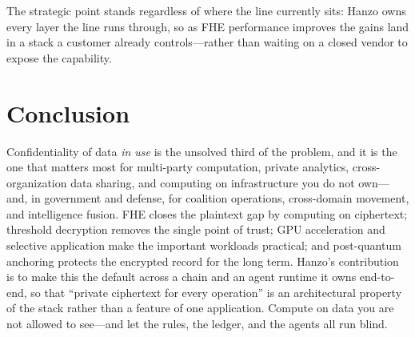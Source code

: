 \documentclass[11pt,letterpaper]{article}
\begin{document}
The strategic point stands regardless of where the line currently sits: Hanzo owns
every layer the line runs through, so as FHE performance improves the gains land in
a stack a customer already controls---rather than waiting on a closed vendor to
expose the capability.

\section{Conclusion}

Confidentiality of data \emph{in use} is the unsolved third of the problem, and it
is the one that matters most for multi-party computation, private analytics,
cross-organization data sharing, and computing on infrastructure you do not
own---and, in government and defense, for coalition operations, cross-domain
movement, and intelligence fusion. FHE closes the
plaintext gap by computing on ciphertext; threshold decryption removes the single
point of trust; GPU acceleration and selective application make the important
workloads practical; and post-quantum anchoring protects the encrypted record for
the long term. Hanzo's contribution is to make this the default across a chain and
an agent runtime it owns end-to-end, so that ``private ciphertext for every
operation'' is an architectural property of the stack rather than a feature of one
application. Compute on data you are not allowed to see---and let the rules,
the ledger, and the agents all run blind.
\end{document}
